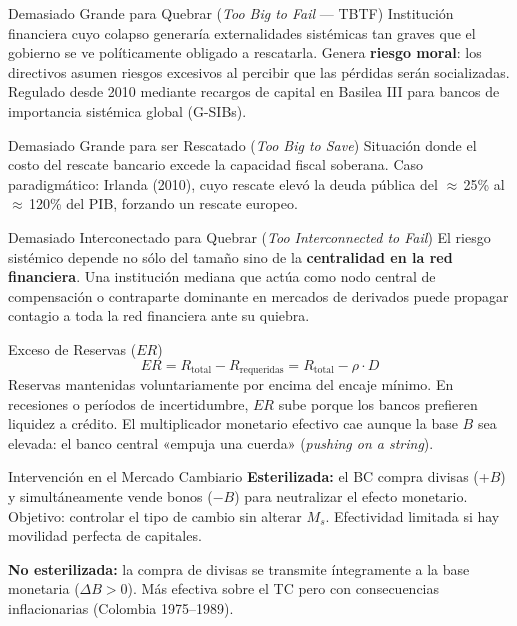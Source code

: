 \documentclass[12pt,a4paper]{article}
\begin{document}
\begin{defbox}{Demasiado Grande para Quebrar (\textit{Too Big to Fail} --- TBTF)}
Institución financiera cuyo colapso generaría externalidades sistémicas tan
graves que el gobierno se ve políticamente obligado a rescatarla. Genera
\textbf{riesgo moral}: los directivos asumen riesgos excesivos al percibir que
las pérdidas serán socializadas. Regulado desde 2010 mediante recargos de
capital en Basilea III para bancos de importancia sistémica global (G-SIBs).
\end{defbox}

\begin{defbox}{Demasiado Grande para ser Rescatado (\textit{Too Big to Save})}
Situación donde el costo del rescate bancario excede la capacidad fiscal soberana.
Caso paradigmático: Irlanda (2010), cuyo rescate elevó la deuda pública del
$\approx$\,25\% al $\approx$\,120\% del PIB, forzando un rescate europeo.
\end{defbox}

\begin{defbox}{Demasiado Interconectado para Quebrar (\textit{Too Interconnected to Fail})}
El riesgo sistémico depende no sólo del tamaño sino de la \textbf{centralidad en
la red financiera}. Una institución mediana que actúa como nodo central de
compensación o contraparte dominante en mercados de derivados puede propagar
contagio a toda la red financiera ante su quiebra.
\end{defbox}

\begin{defbox}{Exceso de Reservas ($ER$)}
\[ER = R_{\text{total}} - R_{\text{requeridas}} = R_{\text{total}} - \rho\cdot D\]
Reservas mantenidas voluntariamente por encima del encaje mínimo. En recesiones
o períodos de incertidumbre, $ER$ sube porque los bancos prefieren liquidez a
crédito. El multiplicador monetario efectivo cae aunque la base $B$ sea elevada:
el banco central «empuja una cuerda» (\textit{pushing on a string}).
\end{defbox}

\begin{defbox}{Intervención en el Mercado Cambiario}
\textbf{Esterilizada:} el BC compra divisas (+$B$) y simultáneamente vende bonos
($-B$) para neutralizar el efecto monetario. Objetivo: controlar el tipo de cambio
sin alterar $M_s$. Efectividad limitada si hay movilidad perfecta de capitales.

\textbf{No esterilizada:} la compra de divisas se transmite íntegramente a la base
monetaria ($\Delta B > 0$). Más efectiva sobre el TC pero con consecuencias
inflacionarias (Colombia 1975--1989).
\end{defbox}
\end{document}
